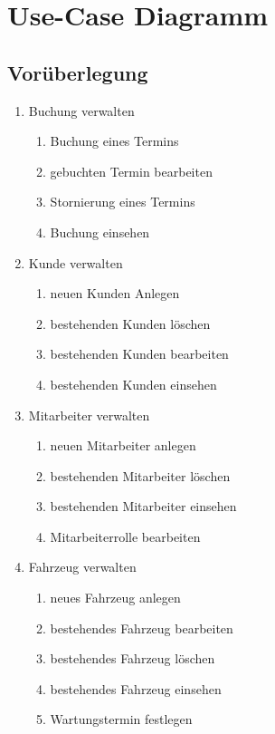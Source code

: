\chapter{Use-Case Diagramm}

\section{Vorüberlegung}

\begin{enumerate}
    \item Buchung verwalten
    \begin{enumerate}[itemsep= -0.25 cm]
        \item Buchung eines Termins
        \item gebuchten Termin bearbeiten
        \item Stornierung eines Termins
        \item Buchung einsehen
    \end{enumerate}
    \item Kunde verwalten
    \begin{enumerate}[itemsep= -0.25 cm]
        \item neuen Kunden Anlegen
        \item bestehenden Kunden löschen
        \item bestehenden Kunden bearbeiten
        \item bestehenden Kunden einsehen
    \end{enumerate}
    \item Mitarbeiter verwalten
    \begin{enumerate}[itemsep= -0.25 cm]
        \item neuen Mitarbeiter anlegen
        \item bestehenden Mitarbeiter löschen
        \item bestehenden Mitarbeiter einsehen
        \item Mitarbeiterrolle bearbeiten
    \end{enumerate}
    \item Fahrzeug verwalten
    \begin{enumerate}[itemsep= -0.25 cm]
        \item neues Fahrzeug anlegen 
        \item bestehendes Fahrzeug bearbeiten
        \item bestehendes Fahrzeug löschen
        \item bestehendes Fahrzeug einsehen
        \item Wartungstermin festlegen

\end{enumerate}
\end{enumerate}
